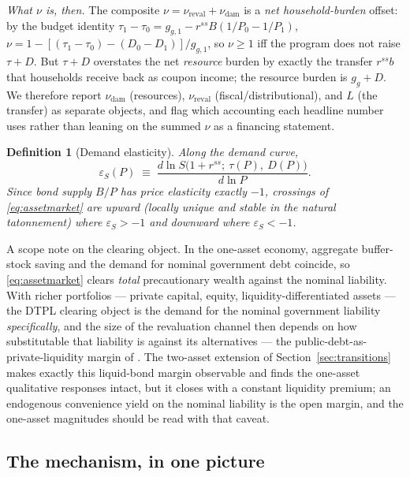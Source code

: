 \documentclass[12pt]{article}
\newtheorem{definition}{Definition}
\newcommand{\Sfun}{S}
\begin{document}
\emph{What $\nu$ is, then.} The composite $\nu=\nu_{\mathrm{reval}}+\nu_{\mathrm{dam}}$
is a \emph{net household-burden} offset: by the budget identity
$\tau_1-\tau_0=g_{g,1}-r^{ss}B(1/P_0-1/P_1)$,
$\nu=1-[(\tau_1-\tau_0)-(D_0-D_1)]/g_{g,1}$, so $\nu\ge1$ iff the program does
not raise $\tau+D$. But $\tau+D$ overstates the net \emph{resource} burden by
exactly the transfer $r^{ss}b$ that households receive back as coupon income;
the resource burden is $g_g+D$. We therefore report $\nu_{\mathrm{dam}}$
(resources), $\nu_{\mathrm{reval}}$ (fiscal/distributional), and $L$ (the
transfer) as separate objects, and flag which accounting each headline number
uses rather than leaning on the summed $\nu$ as a financing statement.

\begin{definition}[Demand elasticity]\label{def:elasticity}
Along the demand curve,
\[
\varepsilon_S(P) \;\equiv\;
\frac{d\ln \Sfun\big(1+r^{ss};\ \tau(P),\ D(P)\big)}{d\ln P}.
\]
Since bond supply $B/P$ has price
elasticity exactly $-1$, crossings of \eqref{eq:assetmarket} are
\emph{upward} (locally unique and stable in the natural tatonnement) where
$\varepsilon_S>-1$ and \emph{downward} where $\varepsilon_S<-1$.
\end{definition}

A scope note on the clearing object. In the one-asset economy, aggregate
buffer-stock saving and the demand for nominal government debt coincide,
so \eqref{eq:assetmarket} clears \emph{total} precautionary wealth against
the nominal liability. With richer portfolios --- private capital, equity,
liquidity-differentiated assets --- the DTPL clearing object is the demand
for the nominal government liability \emph{specifically}, and the size of
the revaluation channel then depends on how substitutable that liability
is against its alternatives --- the public-debt-as-private-liquidity margin
of \citet{woodford1990}. The two-asset extension of
Section~\ref{sec:transitions} makes exactly this liquid-bond margin
observable and finds the one-asset qualitative responses intact, but it
closes with a constant liquidity premium; an endogenous convenience yield
on the nominal liability is the open margin, and the one-asset magnitudes
should be read with that caveat.

\subsection{The mechanism, in one picture}\label{subsec:mechanism}
\end{document}

